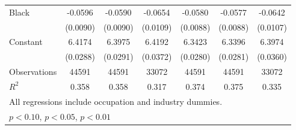 {\begin{longtable}{l*{6}{c}}
Black               &     -0.0596\sym{***}&     -0.0590\sym{***}&     -0.0654\sym{***}&     -0.0580\sym{***}&     -0.0577\sym{***}&     -0.0642\sym{***}\\
                    &    (0.0090)         &    (0.0090)         &    (0.0109)         &    (0.0088)         &    (0.0088)         &    (0.0107)         \\
Constant            &      6.4174\sym{***}&      6.3975\sym{***}&      6.4192\sym{***}&      6.3423\sym{***}&      6.3396\sym{***}&      6.3974\sym{***}\\
                    &    (0.0288)         &    (0.0291)         &    (0.0372)         &    (0.0280)         &    (0.0281)         &    (0.0360)         \\
\hline  
Observations        &       44591         &       44591         &       33072         &       44591         &       44591         &       33072         \\
\(R^{2}\)           &       0.358         &       0.358         &       0.317         &       0.374         &       0.375         &       0.335         \\
\hline  
\multicolumn{7}{l}{\footnotesize All regressions include occupation and industry dummies.}\\
\multicolumn{7}{l}{\footnotesize \sym{*} \(p<0.10\), \sym{**} \(p<0.05\), \sym{***} \(p<0.01\)}\\
\end{longtable}
}
